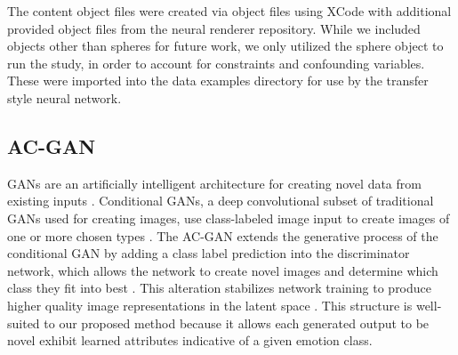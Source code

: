 \documentclass{sigchi}
\begin{document}
The content object files were created via object files using XCode with additional provided object files from the neural renderer repository. While we included objects other than spheres for future work, we only utilized the sphere object to run the study, in order to account for constraints and confounding variables. These were imported into the data examples directory for use by the transfer style neural network.

\subsection{AC-GAN}
GANs are an artificially intelligent architecture for creating novel data from existing inputs \cite{goodfellow2014generative}. Conditional GANs, a deep convolutional subset of traditional GANs used for creating images, use class-labeled image input to create images of one or more chosen types \cite{10.5555/3305890.3305954}. The AC-GAN extends the generative process of the conditional GAN by adding a class label prediction into the discriminator network, which allows the network to create novel images and determine which class they fit into best \cite{10.5555/3305890.3305954}. This alteration stabilizes network training to produce higher quality image representations in the latent space \cite{acgan}. This structure is well-suited to our proposed method because it allows each generated output to be novel exhibit learned attributes indicative of a given emotion class. 
\end{document}
